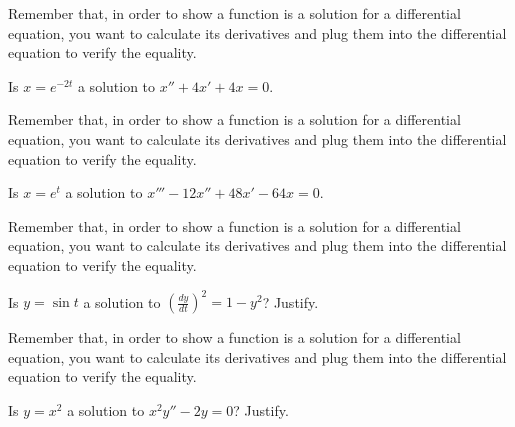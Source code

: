 \documentclass{ximera}
\begin{document}
\begin{exercise}%
    \begin{hint}
        Remember that, in order to show a function is a solution for a differential equation, you want to calculate its derivatives and plug them into the differential equation to verify the equality.
    \end{hint}
    Is $x = e^{-2t}$ a solution to $x'' + 4x' + 4x = 0$.
    \begin{multipleChoice}
    \end{multipleChoice}
\end{exercise}

\begin{exercise}
    \begin{hint}
        Remember that, in order to show a function is a solution for a differential equation, you want to calculate its derivatives and plug them into the differential equation to verify the equality.
    \end{hint}
    Is $x = e^{t}$ a solution to $x'''-12 x'' + 48 x' - 64 x = 0$.
    \begin{multipleChoice}
    \end{multipleChoice}
\end{exercise}

\begin{exercise}
    \begin{hint}
        Remember that, in order to show a function is a solution for a differential equation, you want to calculate its derivatives and plug them into the differential equation to verify the equality.
    \end{hint}
    Is $y = \sin t$ a solution to ${\left( \frac{dy}{dt} \right)}^2 = 1 - y^2$? Justify.
    \begin{multipleChoice}
    \end{multipleChoice}
\end{exercise}

\begin{exercise}%
    \begin{hint}
        Remember that, in order to show a function is a solution for a differential equation, you want to calculate its derivatives and plug them into the differential equation to verify the equality.
    \end{hint}
    Is $y = x^2$ a solution to $x^2y'' - 2y = 0$?  Justify.
    \begin{multipleChoice}
    \end{multipleChoice}
\end{exercise}
\end{document}

